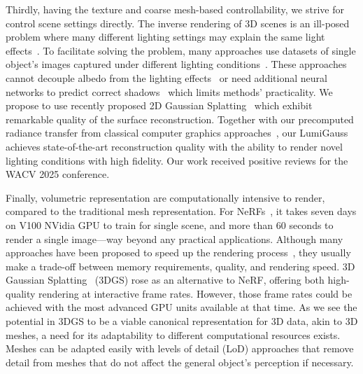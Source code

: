   Thirdly, having the texture and coarse mesh-based controllability, we strive
  for control scene settings directly.
  The inverse rendering of 3D scenes is an ill-posed problem where many
  different lighting settings may explain the same light
  effects~\cite{patow2003survey}.
  To facilitate solving the problem, many approaches use datasets of single
  object's images captured under different lighting
  conditions~\cite{chen2022hallucinated,yang2023crnerf,rudnev2022nerfosr}.
  These approaches cannot decouple albedo from the lighting
  effects~\cite{chen2022hallucinated,yang2023crnerf} or need additional neural
  networks to predict correct shadows~\cite{rudnev2022nerfosr} which limits
  methods' practicality.
  We propose to use recently proposed 2D Gaussian Splatting~\cite{huang20242d}
  which exhibit remarkable quality of the surface reconstruction.
  Together with our precomputed radiance transfer from classical computer
  graphics approaches~\cite{slomp2006gentle,ramamoorthi2001envmap}, our
  LumiGauss achieves state-of-the-art reconstruction quality with the ability
  to render novel lighting conditions with high fidelity.
  Our work received positive reviews for the WACV 2025 conference.

  Finally, volumetric representation are computationally intensive to render,
  compared to the traditional mesh representation.
  For NeRFs~\cite{mildenhall2020nerf}, it takes seven days on V100 NVidia GPU
  to train for single scene, and more than 60 seconds to render a single
  image---way beyond any practical applications.
  Although many approaches have been proposed to speed up the rendering
  process~\cite{garbin2021fastnerf,yu2021plenoctrees,reiser2021kilonerf,hedman2021baking,mueller2022instant},
  they usually make a trade-off between memory requirements, quality, and
  rendering speed.
  3D Gaussian Splatting~\cite{kerbl20233d} (3DGS) rose as an alternative to NeRF, offering both high-quality rendering at interactive frame rates.
  However, those frame rates could be achieved with the most advanced GPU
  units available at that time.
  As we see the potential in 3DGS to be a viable canonical representation for
  3D data, akin to 3D meshes, a need for its adaptability to different
  computational resources exists.
  Meshes can be adapted easily with levels of detail (LoD) approaches that
  remove detail from meshes that do not affect the general object's perception
  if necessary.

